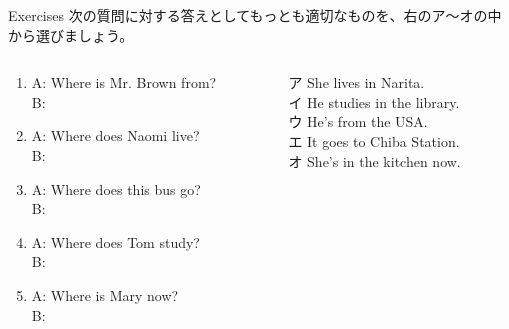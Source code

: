 \documentclass[aspectratio=169,xcolor={dvipsnames,table}]{beamer}
\begin{document}
\begin{frame}[plain]{Exercises}
 次の質問に対する答えとしてもっとも適切なものを、右のア～オの中から選びましょう。

\begin{columns}[t]
 \begin{column}{.475\textwidth}
\begin{enumerate}
 \item A: Where is Mr. Brown from?\\
B: 
 \item A: Where does Naomi live?\\
B: 
 \item A: Where does this bus go?\\
B: 
 \item A: Where does Tom study?\\
B: 
 \item A: Where is Mary now?\\
B: 
\end{enumerate}  
 \end{column}
\begin{column}{.475\textwidth}
\begin{tcolorbox}
ア She lives in Narita.\\
イ He studies in the library.\\
ウ He's from the USA.\\
エ It goes to Chiba Station.\\
オ She's in the kitchen now.
\end{tcolorbox} 
\end{column}
\end{columns}


\end{frame}
\end{document}
